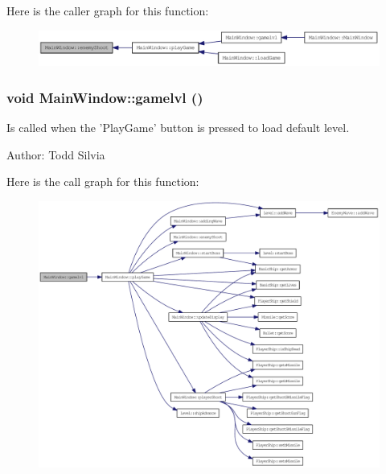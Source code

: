 Here is the caller graph for this function:\nopagebreak
\begin{figure}[H]
\begin{center}
\leavevmode
\includegraphics[width=331pt]{class_main_window_ac609f6dbbde76c9bc720a36aac05b633_icgraph}
\end{center}
\end{figure}
\hypertarget{class_main_window_a18edf6e25d25b890fb889dae523d45f9}{
\subsubsection[{gamelvl}]{\setlength{\rightskip}{0pt plus 5cm}void MainWindow::gamelvl ()}}
\label{class_main_window_a18edf6e25d25b890fb889dae523d45f9}
Is called when the 'PlayGame' button is pressed to load default level.

Author: Todd Silvia 

Here is the call graph for this function:\nopagebreak
\begin{figure}[H]
\begin{center}
\leavevmode
\includegraphics[width=420pt]{class_main_window_a18edf6e25d25b890fb889dae523d45f9_cgraph}
\end{center}
\end{figure}


